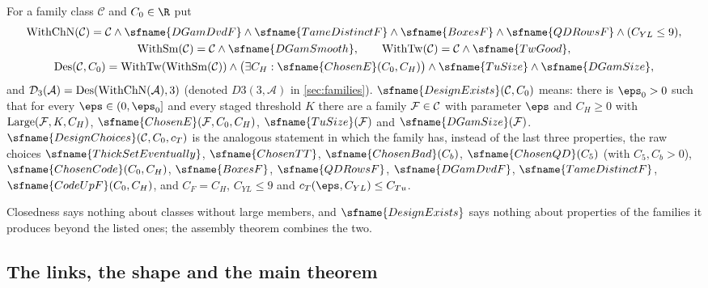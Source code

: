 \begin{definition}\label{pf:top-shape:decor}
For a family class $\mathcal C$ and $C_0\in\R$ put
\begin{gather*}
\mathrm{WithChN}(\mathcal C)=\mathcal C\wedge\sfname{DGamDvdF}\wedge\sfname{TameDistinctF}\wedge
\sfname{BoxesF}\wedge\sfname{QDRowsF}\wedge(C_{YL}\le9),\\
\mathrm{WithSm}(\mathcal C)=\mathcal C\wedge\sfname{DGamSmooth},\qquad
\mathrm{WithTw}(\mathcal C)=\mathcal C\wedge\sfname{TwGood},\\
\topshapeDes(\mathcal C,C_0)=\mathrm{WithTw}(\mathrm{WithSm}(\mathcal C))\wedge
\bigl(\exists C_H:\sfname{ChosenE}(C_0,C_H)\bigr)\wedge\sfname{TuSize}\wedge\sfname{DGamSize},
\end{gather*}
and $\mathcal{D}_3(\mathcal A)=\mathrm{Des}(\mathrm{WithChN}(\mathcal A),3)$ (denoted $D3(3,\mathcal A)$ in
\cref{sec:families}). $\sfname{DesignExists}(\mathcal C,C_0)$ means: there is $\eps_0>0$ such that for every
$\eps\in(0,\eps_0]$ and every staged threshold $K$ there are a family $\mathcal{F}\in\mathcal C$ with parameter
$\eps$ and $C_H\ge0$ with $\mathrm{Large}(\mathcal{F},K,C_H)$, $\sfname{ChosenE}(\topshapeF,C_0,C_H)$,
$\sfname{TuSize}(\topshapeF)$ and $\sfname{DGamSize}(\topshapeF)$. $\sfname{DesignChoices}(\mathcal C,C_0,c_T)$
is the analogous statement in which the family has, instead of the last three properties, the raw choices
$\sfname{ThickSetEventually}$, $\sfname{ChosenTT}$, $\sfname{ChosenBad}(C_b)$, $\sfname{ChosenQD}(C_5)$ (with
$C_5,C_b>0$), $\sfname{ChosenCode}(C_0,C_H)$, $\sfname{BoxesF}$, $\sfname{QDRowsF}$, $\sfname{DGamDvdF}$,
$\sfname{TameDistinctF}$, $\sfname{CodeUpF}(C_0,C_H)$, and $C_F=C_H$, $C_{YL}\le9$ and
$c_T(\eps,C_{YL})\le C_{Tu}$.
\end{definition}

Closedness says nothing about classes without large members, and $\sfname{DesignExists}$ says nothing about
properties of the families it produces beyond the listed ones; the assembly theorem combines the two.

\subsection{The links, the shape and the main theorem}\label{sec:pf:top-shape:statement}


